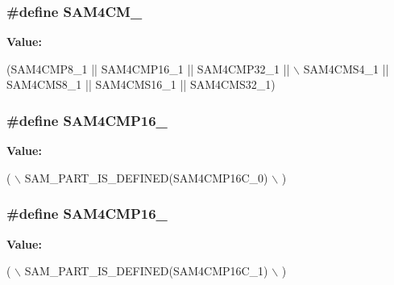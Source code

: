 \subsubsection[{S\+A\+M4\+C\+M\+\_\+1}]{\setlength{\rightskip}{0pt plus 5cm}\#define S\+A\+M4\+C\+M\+\_}\label{group__sam__part__macros__group_ga40dfb0460f36223679de0af78510caab}
{\bfseries Value\+:}
\begin{DoxyCode}
(SAM4CMP8\_1 || SAM4CMP16\_1 || SAM4CMP32\_1 || \(\backslash\)
            SAM4CMS4\_1 || SAM4CMS8\_1 || SAM4CMS16\_1 || SAM4CMS32\_1)
\end{DoxyCode}
\hypertarget{group__sam__part__macros__group_ga3c4d12eff2cac193d008a1a33763cdea}{}
\subsubsection[{S\+A\+M4\+C\+M\+P16\+\_\+0}]{\setlength{\rightskip}{0pt plus 5cm}\#define S\+A\+M4\+C\+M\+P16\+\_}\label{group__sam__part__macros__group_ga3c4d12eff2cac193d008a1a33763cdea}
{\bfseries Value\+:}
\begin{DoxyCode}
( \(\backslash\)
        SAM\_PART\_IS\_DEFINED(SAM4CMP16C\_0) \(\backslash\)
        )
\end{DoxyCode}
\hypertarget{group__sam__part__macros__group_ga1339cdbe5a862d94adeeae3b32f2c8c7}{}
\subsubsection[{S\+A\+M4\+C\+M\+P16\+\_\+1}]{\setlength{\rightskip}{0pt plus 5cm}\#define S\+A\+M4\+C\+M\+P16\+\_}\label{group__sam__part__macros__group_ga1339cdbe5a862d94adeeae3b32f2c8c7}
{\bfseries Value\+:}
\begin{DoxyCode}
( \(\backslash\)
        SAM\_PART\_IS\_DEFINED(SAM4CMP16C\_1) \(\backslash\)
        )
\end{DoxyCode}
\hypertarget{group__sam__part__macros__group_gaf581d4fe9779afce853dfe577bdeb67b}{}
